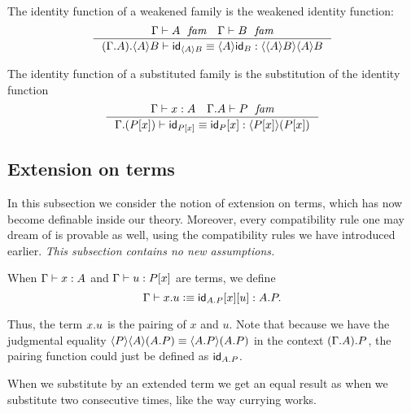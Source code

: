 The identity function of a weakened family is the weakened identity function:
\begin{equation}\label{idfunc-wk-comp}
\inference
  {\jfam{\Gamma}{A}
   \jfam{\Gamma}{B}}
  {\jtermeq{{{\Gamma}{A}}{\ctxwk{A}{B}}}{\ctxwk{{A}{B}}{{A}{B}}}{\idfunc[\ctxwk{A}{B}]}{\ctxwk{A}{\idfunc[B]}}}
\end{equation}

The identity function of a substituted family is the substitution of the identity function
\begin{equation}\label{idfunc-subst-comp}
\inference
  {\jterm{\Gamma}{A}{x}
   \jfam{{\Gamma}{A}}{P}}
  {\jtermeq{{\Gamma}{\subst{x}{P}}}{\ctxwk{\subst{x}{P}}{\subst{x}{P}}}{\idfunc[\subst{x}{P}]}{\subst{x}{\idfunc[P]}}}
\end{equation}

\subsection{Extension on terms}\label{extension-on-terms}
In this subsection we consider the notion of extension on terms, which has now
become definable inside our theory. Moreover, every compatibility rule one may
dream of is provable as well, using the compatibility rules we have introduced
earlier. \emph{This subsection contains no new assumptions.}

\begin{defn}
When $\jterm{\Gamma}{A}{x}$ and $\jterm{\Gamma}{\subst{x}{P}}{u}$ are terms,
we define 
\begin{equation*}
\jtermdefn{\Gamma}{\ctxext{A}{P}}{\ctxext{x}{u}}{\subst{u}{{x}{\idfunc[\ctxext{A}{P}]}}}.
\end{equation*} 
\end{defn}

Thus, the term $\ctxext{x}{u}$ is the pairing of $x$ and $u$. Note that because
we have the judgmental equality 
$\ctxwk{P}{{A}{\ctxext{A}{P}}}\jdeq\ctxwk{\ctxext{A}{P}}{\ctxext{A}{P}}$ in the
context $\ctxext{{\Gamma}{A}}{P}$, the
pairing function could just be defined as $\idfunc[\ctxext{A}{P}]$. 

When we substitute by an extended term we get an equal result as when we
substitute two consecutive times, like the way currying works.

